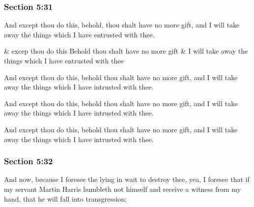 	\subsubsection{Section 5:31} %
		\label{DC5-31}

		And except thou do this, behold, thou shalt have no more gift, and I will take away the things which I have entrusted with thee.

		\begin{framed}
		\scriptsize
			\begin{compactdesc}
				\item[JSP] \& excep thou do this Behold thou shalt have no more gift \& I will take away the things which I have entrusted with thee
				\item[RB1] [\textit{missing}]
				\item[BC] And except thou do this, behold thou shalt have no more gift, and I will take away the things which I have intrusted with thee.
				\item[DC 1835] And except thou do this, behold thou shalt have no more gift, and I will take away the things which I have intrusted with thee.
				\item[DC 1844] And except thou do this, behold thou shalt have no more gift, and I will take away the things which I have intrusted with thee.
			\end{compactdesc}
		\end{framed}

	\subsubsection{Section 5:32} %
		\label{DC5-32}

		And now, because I foresee the lying in wait to destroy thee, yea, I foresee that if my servant Martin Harris humbleth not himself and receive a witness from my hand, that he will fall into transgression;

